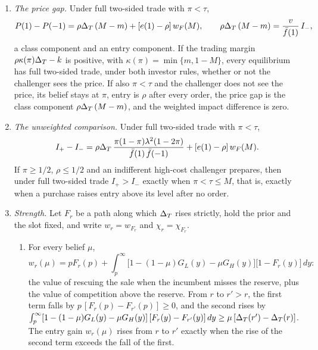 \begin{proposition}
\begin{enumerate}[label=(\roman*),leftmargin=2em]
positive exactly when \(e(1)>\rho\); at \(\tau=m\) it is \(-[1-e(-1)]\,\bar f(-1)\,w_F(m)\le0\), negative exactly when
\(e(-1)<1\). At \(\tau=\pi\), full two-sided trade is an equilibrium with one entry \(e(0)\in[\rho,1]\) after no
order exactly when it is an equilibrium with every such entry, and as \(e(0)\) runs over \([\rho,1]\) the weighted
impact difference \(\bar f(1)\,[1-e(0)]\,w_F(M)-\bar f(-1)\,[e(0)-\rho]\,w_F(m)\) takes every value from
\(-(1-\rho)\,\bar f(-1)\,w_F(m)\) to \((1-\rho)\,\bar f(1)\,w_F(M)\).
\item \emph{The price gap.} Under full two-sided trade with \(\pi<\tau\),
\[
P(1)-P(-1)=\rho\Delta_T\,(M-m)+[e(1)-\rho]\,w_F(M),\qquad \rho\Delta_T\,(M-m)=\frac{v}{\bar f(1)}\,I_-,
\]
a class component and an entry component. If the trading margin \(\rho\kappa(\pi)\Delta_T-k\) is positive, with
\(\kappa(\pi)=\min\{m,1-M\}\), every equilibrium has full two-sided trade, under both investor rules, whether or not
the challenger sees the price. If also \(\pi<\tau\) and the challenger does not see the price, its belief stays at
\(\pi\), entry is \(\rho\) after every order, the price gap is the class component \(\rho\Delta_T\,(M-m)\), and the
weighted impact difference is zero.
\item \emph{The unweighted comparison.} Under full two-sided trade with \(\pi<\tau\),
\[
I_+-I_-=\rho\Delta_T\,\frac{\pi(1-\pi)\lambda^2(1-2\pi)}{\bar f(1)\,\bar f(-1)}+[e(1)-\rho]\,w_F(M).
\]
If \(\pi\ge1/2\), \(\rho\le1/2\) and an indifferent high-cost challenger prepares, then under full two-sided trade
\(I_+>I_-\) exactly when \(\pi<\tau\le M\), that is, exactly when a purchase raises entry above its level after no
order.
\item \emph{Strength.} Let \(F_r\) be a path along which \(\Delta_T\) rises strictly, hold the prior and the slot fixed,
and write \(w_r=w_{F_r}\) and \(\chi_r=\chi_{F_r}\).
\begin{enumerate}[label=(\alph*),leftmargin=2em]
\item For every belief \(\mu\),
\[
w_r(\mu)=pF_r(p)+\int_p^\infty\bigl[1-(1-\mu)G_L(y)-\mu G_H(y)\bigr]\bigl[1-F_r(y)\bigr]\,dy:
\]
the value of rescuing the sale when the incumbent misses the reserve, plus the value of competition above the
reserve. From \(r\) to \(r'>r\), the first term falls by \(p\,[F_r(p)-F_{r'}(p)]\ge0\), and the second rises by
\(\int_p^\infty[1-(1-\mu)G_L(y)-\mu G_H(y)]\,[F_r(y)-F_{r'}(y)]\,dy\ge\mu\,[\Delta_T(r')-\Delta_T(r)]\). The entry gain
\(w_r(\mu)\) rises from \(r\) to \(r'\) exactly when the rise of the second term exceeds the fall of the first.

\end{enumerate}
\end{enumerate}
\end{proposition}
